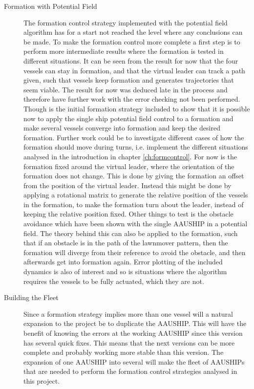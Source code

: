 \begin{description}
\item[Formation with Potential Field] The formation control strategy implemented with the potential field algorithm has for a start not reached the level where any conclusions can be made. To make the formation control more complete a first step is to perform more intermediate results where the formation is tested in different situations. It can be seen from the result for now that the four vessels can stay in formation, and that the virtual leader can track a path given, such that vessels keep formation and generates trajectories that seem viable. The result for now was deduced late in the process and therefore have further work with the error checking not been performed. Though is the initial formation strategy included to show that it is possible now to apply the single ship potential field control to a formation and make several vessels converge into formation and keep the desired formation. Further work could be to investigate different cases of how the formation should move during turns, i.e. implement the different situations analysed in the introduction in chapter \ref{ch:formcontrol}. For now is the formation fixed around the virtual leader, where the orientation of the formation does not change. This is done by giving the formation an offset from the position of the virtual leader. Instead this might be done by applying a rotational matrix to generate the relative position of the vessels in the formation, to make the formation turn about the leader, instead of keeping the relative position fixed. Other things to test is the obstacle avoidance which have been shown with the single AAUSHIP in a potential field. The theory behind this can also be applied to the formation, such that if an obstacle is in the path of the lawnmover pattern, then the formation will diverge from their reference to avoid the obstacle, and then afterwards get into formation again. Error plotting of the included dynamics is also of interest and so is situations where the algorithm requires the vessels to be fully actuated, which they are not.
\item[Building the Fleet] Since a formation strategy implies more than one vessel will a natural expansion to the project be to duplicate the AAUSHIP. This will have the benefit of knowing the errors at the working AAUSHIP since this version has several quick fixes. This means that the next versions can be more complete and probably working more stable than this version. The expansion of one AAUSHIP into several will make the fleet of AAUSHIPs that are needed to perform the formation control strategies analysed in this project.
\end{description}

